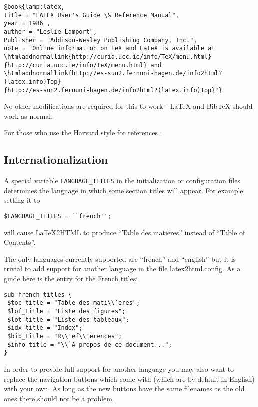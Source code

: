 \begin{small}
\begin{verbatim}
@book{lamp:latex,
title = "LATEX User's Guide \& Reference Manual",
year = 1986 ,
author = "Leslie Lamport",
Publisher = "Addison-Wesley Publishing Company, Inc.",
note = "Online information on TeX and LaTeX is available at
\htmladdnormallink{http://curia.ucc.ie/info/TeX/menu.html}
{http://curia.ucc.ie/info/TeX/menu.html} and
\htmladdnormallink{http://es-sun2.fernuni-hagen.de/info2html?(latex.info)Top}
{http://es-sun2.fernuni-hagen.de/info2html?(latex.info)Top}"}
\end{verbatim}
\end{small}
No other
modifications are required for this to work - LaTeX and BibTeX 
should work as normal.

For those who use the Harvard style for references
.

\subsection{Internationalization}
A special variable {\tt LANGUAGE\_TITLES} 
in the initialization or configuration files determines the language 
in which some section titles will appear. For example setting it to 
\begin{verbatim}
$LANGUAGE_TITLES = ``french'';
\end{verbatim}
will cause LaTeX2HTML to produce ``Table des mati\`{e}res'' instead of
``Table of Contents''.

The only languages currently supported are ``french'' and ``english''
but it is trivial to add support for another language in the
file {\fn latex2html.config}. As a guide here is the entry for 
the French titles:
\begin{verbatim}
sub french_titles {
 $toc_title = "Table des mati\\`eres";	
 $lof_title = "Liste des figures";
 $lot_title = "Liste des tableaux";
 $idx_title = "Index";
 $bib_title = "R\\'ef\\'erences";		
 $info_title = "\\`A propos de ce document..."; 
}
\end{verbatim}

In order to provide full support for another language you may also
want to replace the navigation buttons which come with \latextohtml 
(which are by default in
English)
with your own. As long as the new buttons have the same filenames as the
old ones there should not be a problem.


